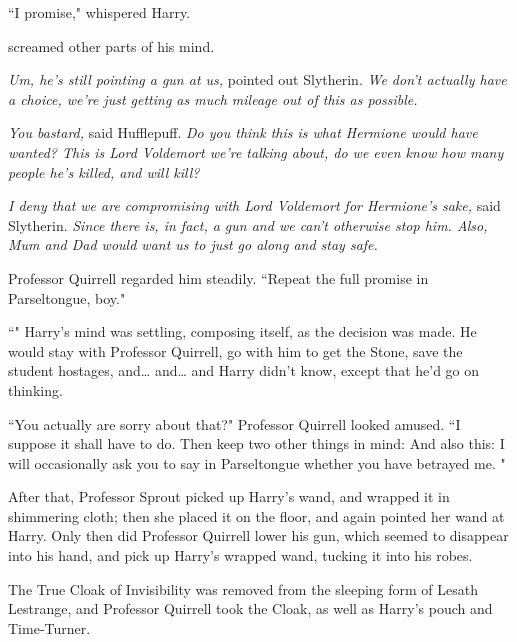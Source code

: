 ``I promise," whispered Harry.

\emph{} screamed other parts of his mind.

\emph{Um, he's still pointing a gun at us,} pointed out Slytherin. \emph{We don't actually have a choice, we're just getting as much mileage out of this as possible.}

\emph{You bastard,} said Hufflepuff. \emph{Do you think this is what Hermione would have wanted? This is Lord Voldemort we're talking about, do we even know how many people he's killed, and will kill?}

\emph{I deny that we are compromising with Lord Voldemort for Hermione's sake,} said Slytherin. \emph{Since there is, in fact, a gun and we can't otherwise stop him. Also, Mum and Dad would want us to just go along and stay safe.}

Professor Quirrell regarded him steadily. ``Repeat the full promise in Parseltongue, boy."

``" Harry's mind was settling, composing itself, as the decision was made. He would stay with Professor Quirrell, go with him to get the Stone, save the student hostages, and{\ldots} and{\ldots} and Harry didn't know, except that he'd go on thinking.

``You actually are sorry about that?" Professor Quirrell looked amused. ``I suppose it shall have to do. Then keep two other things in mind:  And also this: I will occasionally ask you to say in Parseltongue whether you have betrayed me. "

\later

After that, Professor Sprout picked up Harry's wand, and wrapped it in shimmering cloth; then she placed it on the floor, and again pointed her wand at Harry. Only then did Professor Quirrell lower his gun, which seemed to disappear into his hand, and pick up Harry's wrapped wand, tucking it into his robes.

The True Cloak of Invisibility was removed from the sleeping form of Lesath Lestrange, and Professor Quirrell took the Cloak, as well as Harry's pouch and Time-Turner.

